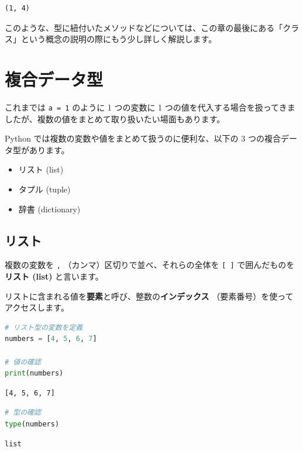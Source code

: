 \begin{lstlisting}[style=outputcell]
(1, 4)
\end{lstlisting}

このような、型に紐付いたメソッドなどについては、この章の最後にある「クラス」という概念の説明の際にもう少し詳しく解説します。


\section{複合データ型}


これまでは \texttt{a = 1} のように 1 つの変数に 1 つの値を代入する場合を扱ってきましたが、複数の値をまとめて取り扱いたい場面もあります。

Python では複数の変数や値をまとめて扱うのに便利な、以下の 3 つの複合データ型があります。


\begin{itemize}
\item リスト (list)
\item タプル (tuple)
\item 辞書 (dictionary)
\end{itemize}


\subsection{リスト}


複数の変数を \texttt{,} （カンマ）区切りで並べ、それらの全体を \texttt{[ ]} で囲んだものを \textbf{リスト (list)} と言います。

リストに含まれる値を\textbf{要素}と呼び、整数の\textbf{インデックス} （要素番号）を使ってアクセスします。


\begin{lstlisting}[style=codecell,language=Python]
# リスト型の変数を定義
numbers = [4, 5, 6, 7]

# 値の確認
print(numbers)
\end{lstlisting}

\begin{lstlisting}[style=outputcell]
[4, 5, 6, 7]
\end{lstlisting}

\begin{lstlisting}[style=codecell,language=Python]
# 型の確認
type(numbers)
\end{lstlisting}

\begin{lstlisting}[style=outputcell]
list
\end{lstlisting}

